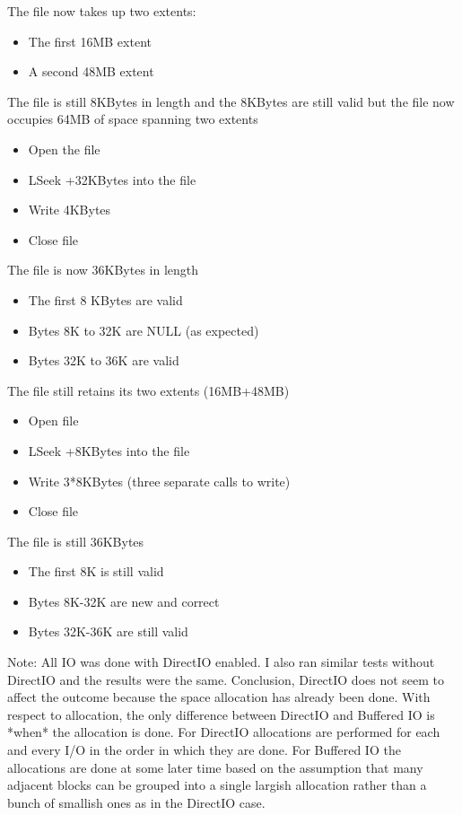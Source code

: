 The file now takes up two extents:

\begin{itemize}
\item
  The first 16MB extent
\item
  A second 48MB extent~
\end{itemize}

The file is still 8KBytes in length and the 8KBytes are still valid but the file now occupies 64MB of space spanning two extents

\begin{itemize}
\item
  Open the file~
\item
  LSeek +32KBytes into the file
\item
  Write 4KBytes
\item
  Close file
\end{itemize}

The file is now 36KBytes in length

\begin{itemize}
\item
  The first 8 KBytes are valid
\item
  Bytes 8K to 32K are NULL (as expected)
\item
  Bytes 32K to 36K are valid
\end{itemize}

The file still retains its two extents (16MB+48MB)

\begin{itemize}
\item
  Open file~
\item
  LSeek +8KBytes into the file
\item
  Write 3*8KBytes (three separate calls to write)
\item
  Close file
\end{itemize}

The file is still 36KBytes~

\begin{itemize}
\item
  The first 8K is still valid
\item
  Bytes 8K-32K are new and correct
\item
  Bytes 32K-36K are still valid
\end{itemize}

Note: All IO was done with DirectIO enabled. I also ran similar tests without DirectIO and the results were the same. Conclusion, DirectIO does not seem to affect the outcome because the space allocation has already been done. With respect to allocation, the only difference between DirectIO and Buffered IO is *when* the allocation is done. For DirectIO allocations are performed for each and every I/O in the order in which they are done. For Buffered IO the allocations are done at some later time based on the assumption that many adjacent blocks can be grouped into a single largish allocation rather than a bunch of smallish ones as in the DirectIO case.


